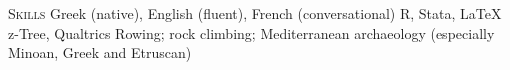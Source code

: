 
\begin{rubric}{\textsc{Skills}}
\entry*[Languages]
	Greek (native), English (fluent),  French (conversational)
	R, Stata, \LaTeX
\entry*[Experiments]
	z-Tree, Qualtrics
\entry*[Hobbies]
	Rowing; rock climbing; Mediterranean archaeology (especially Minoan, Greek and \mbox{Etruscan})

\end{rubric}
